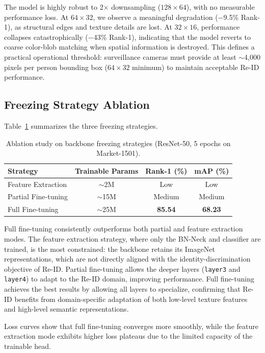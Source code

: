 \documentclass[final]{cvpr}
\begin{document}
The model is highly robust to 2$\times$ downsampling ($128 \times 64$), with no measurable performance loss.
At $64 \times 32$, we observe a meaningful degradation ($-$9.5\% Rank-1), as structural edges and texture details are lost.
At $32 \times 16$, performance collapses catastrophically ($-$43\% Rank-1), indicating that the model reverts to coarse color-blob matching when spatial information is destroyed.
This defines a practical operational threshold: surveillance cameras must provide at least $\sim$4,000 pixels per person bounding box ($64 \times 32$ minimum) to maintain acceptable Re-ID performance.

\subsection{Freezing Strategy Ablation}

Table~\ref{tab:ablation} summarizes the three freezing strategies.

\begin{table}[h]
\centering
\caption{Ablation study on backbone freezing strategies (ResNet-50, 5 epochs on Market-1501).}
\label{tab:ablation}
\begin{tabular}{lccc}
\toprule
\textbf{Strategy} & \textbf{Trainable Params} & \textbf{Rank-1 (\%)} & \textbf{mAP (\%)} \\
\midrule
Feature Extraction & $\sim$2M  & Low & Low \\
Partial Fine-tuning & $\sim$15M & Medium & Medium \\
Full Fine-tuning    & $\sim$25M & \textbf{85.54} & \textbf{68.23} \\
\bottomrule
\end{tabular}
\end{table}

Full fine-tuning consistently outperforms both partial and feature extraction modes.
The feature extraction strategy, where only the BN-Neck and classifier are trained, is the most constrained: the backbone retains its ImageNet representations, which are not directly aligned with the identity-discrimination objective of Re-ID.
Partial fine-tuning allows the deeper layers (\texttt{layer3} and \texttt{layer4}) to adapt to the Re-ID domain, improving performance.
Full fine-tuning achieves the best results by allowing all layers to specialize, confirming that Re-ID benefits from domain-specific adaptation of both low-level texture features and high-level semantic representations.

Loss curves show that full fine-tuning converges more smoothly, while the feature extraction mode exhibits higher loss plateaus due to the limited capacity of the trainable head.
\end{document}
